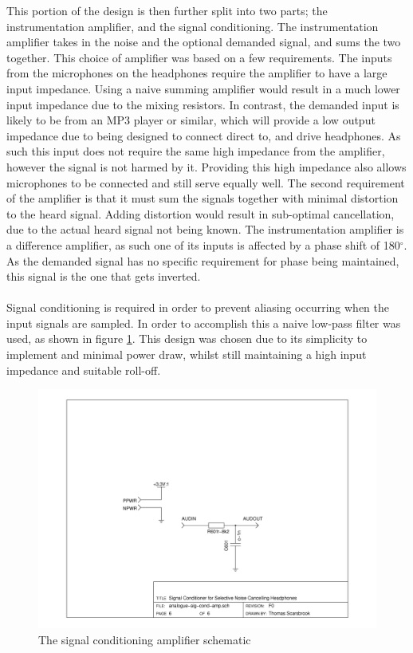 \noindent This portion of the design is then further split into two parts; the instrumentation amplifier, and the signal conditioning.
The instrumentation amplifier takes in the noise and the optional demanded signal, and sums the two together.
This choice of amplifier was based on a few requirements.
The inputs from the microphones on the headphones require the amplifier to have a large input impedance.
Using a naive summing amplifier would result in a much lower input impedance due to the mixing resistors.
In contrast, the demanded input is likely to be from an MP3 player or similar, which will provide a low output impedance due to being designed to connect direct to, and drive headphones.
As such this input does not require the same high impedance from the amplifier, however the signal is not harmed by it.
Providing this high impedance also allows microphones to be connected and still serve equally well.
The second requirement of the amplifier is that it must sum the signals together with minimal distortion to the heard signal.
Adding distortion would result in sub-optimal cancellation, due to the actual heard signal not being known.
The instrumentation amplifier is a difference amplifier, as such one of its inputs is affected by a phase shift of 180$^{\circ}$.
As the demanded signal has no specific requirement for phase being maintained, this signal is the one that gets inverted.
\\
\\
Signal conditioning is required in order to prevent aliasing occurring when the input signals are sampled.
In order to accomplish this a naive low-pass filter was used, as shown in figure \ref{fig:sigcondsch}.
This design was chosen due to its simplicity to implement and minimal power draw, whilst still maintaining a high input impedance and suitable roll-off.

\begin{figure}[H]
	\centering
	\includegraphics[width=\textwidth]{./img/analogue-sig-cond-amp.png}
	\caption{The signal conditioning amplifier schematic}
	\label{fig:sigcondsch}
\end{figure}

